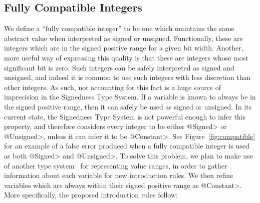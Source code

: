 \subsection{Fully Compatible Integers}
We define a ``fully compatible integer'' to be one which maintains the same abstract
value when interpreted as signed or unsigned. Functionally, these are integers
which are in the signed positive range for a given bit width. Another, more
useful way of expressing this quality is that these are integers whose most
significant bit is zero. Such integers can be safely interpreted as signed and
unsigned, and indeed it is common to use such integers with less discretion than
other integers. As such, not accounting for this fact is a huge source of
imprecision in the Signedness Type System. If a variable is known to always be
in the signed positive range, then it can safely be used as signed or unsigned.
In its current state, the Signedness Type System is not powerful enough to
infer this property, and therefore considers every integer to be either \<@Signed>
or \<@Unsigned>, unless it can infer it to be \<@Constant>.
See Figure~\ref{fig:compatible} for
an example of a false error produced when a fully compatible integer is used
as both \<@Signed> and \<@Unsigned>.
To solve this problem, we plan to make use of another
type system~\cite{ValueChecker} for representing value ranges, in order to
gather information about
each variable for new introduction rules. We then refine variables which are
always within their signed positive range as \<@Constant>.
More specifically, the proposed introduction rules follow:

